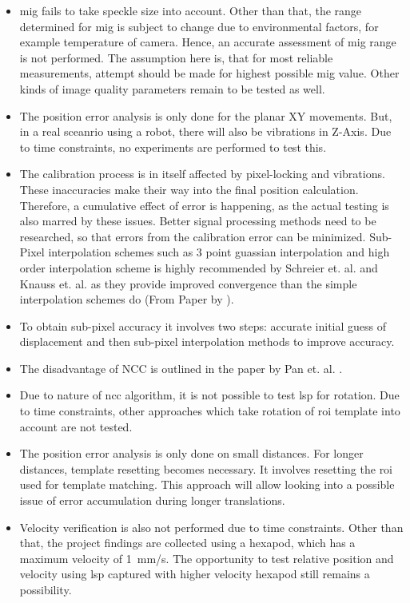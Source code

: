 \begin{itemize}
    \item \gls{mig} fails to take speckle size into account. Other than that, the range determined for \gls{mig} is subject to change due to environmental factors, for example temperature of camera. Hence, an accurate assessment of \gls{mig} range is not performed. The assumption here is, that for most reliable measurements, attempt should be made for highest possible \gls{mig} value. Other kinds of image quality parameters remain to be tested as well. 
    \item The position error analysis is only done for the planar XY movements. But, in a real sceanrio using a robot, there will also be vibrations in Z-Axis. Due to time constraints, no experiments are performed to test this.
    \item The calibration process is in itself affected by pixel-locking and vibrations. These inaccuracies make their way into the final position calculation. Therefore, a cumulative effect of error is happening, as the actual testing is also marred by these issues. Better signal processing methods need to be researched, so that errors from the calibration error can be minimized. Sub-Pixel interpolation schemes such as 3 point guassian interpolation and high order interpolation scheme is highly recommended by Schreier et. al. \cite{schreier} and Knauss et. al. \cite{knauss} as they provide improved convergence than the simple interpolation schemes do (From Paper by \cite{pan}).
    \item To obtain sub-pixel accuracy it involves two steps: accurate initial guess of displacement and then sub-pixel interpolation methods to improve accuracy.
    \item The disadvantage of NCC is outlined in the paper by Pan et. al. \cite{pan}.
    \item Due to nature of \gls{ncc} algorithm, it is not possible to test \gls{lsp} for rotation. Due to time constraints, other approaches which take rotation of \gls{roi} template into account are not tested.
    \item The position error analysis is only done on small distances. For longer distances, template resetting becomes necessary. It involves resetting the \gls{roi} used for template matching. This approach will allow looking into a possible issue of error accumulation during longer translations.
    \item Velocity verification is also not performed due to time constraints. Other than that, the project findings are collected using a hexapod, which has a maximum velocity of \SI{1}{\milli\meter/\second}. The opportunity to test relative position and velocity using \gls{lsp} captured with higher velocity hexapod still remains a possibility.
\end{itemize}